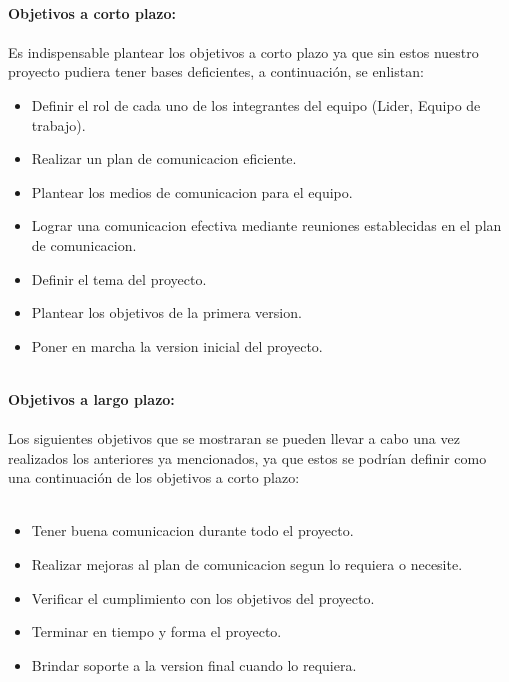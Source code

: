 \documentclass[40pt]{article}
\begin{document}
\maketitle
\textsf{\ \\
\textbf{Objetivos a corto plazo:}\\
\\
Es indispensable plantear los objetivos a corto plazo ya que sin estos nuestro proyecto pudiera tener bases deficientes, a continuación, se enlistan: \\}
\begin{itemize}
    \item Definir el rol de cada uno de los integrantes del equipo (Lider, Equipo de trabajo).
    \item Realizar un plan de comunicacion eficiente.
    \item Plantear los medios de comunicacion para el equipo.
    \item Lograr una comunicacion efectiva mediante reuniones establecidas en el plan de comunicacion.
    \item Definir el tema del proyecto.
    \item Plantear los objetivos de la primera version.
    \item Poner en marcha la version inicial del proyecto.
\end{itemize}

\maketitle
\textsf{\ \\
\textbf{Objetivos a largo plazo:}\\
\\
Los siguientes objetivos que se mostraran se pueden llevar a cabo una vez realizados los anteriores ya mencionados, ya que estos se podrían definir como una continuación de los objetivos a corto plazo: \\}
\\

\begin{itemize}
    \item Tener buena comunicacion durante todo el proyecto.
    \item Realizar mejoras al plan de comunicacion segun lo requiera o necesite.
    \item Verificar el cumplimiento con los objetivos del proyecto.
    \item Terminar en tiempo y forma el proyecto.
    \item Brindar soporte a la version final cuando lo requiera.
\end{itemize}
\end{document}
